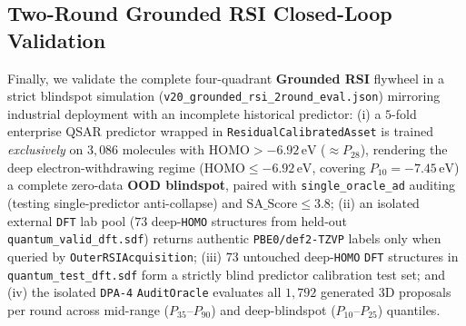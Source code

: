 \documentclass[11pt,a4paper]{article}
\begin{document}
\FloatBarrier
\subsection{Two-Round Grounded RSI Closed-Loop Validation}
\label{sec:exp_rsi}

Finally, we validate the complete four-quadrant \textbf{Grounded RSI} flywheel in a strict blindspot simulation (\texttt{v20\_grounded\_rsi\_2round\_eval.json}) mirroring industrial deployment with an incomplete historical predictor:
(i) a $5$-fold enterprise QSAR predictor wrapped in \texttt{Residual\allowbreak Calibrated\allowbreak Asset} is trained \emph{exclusively} on $3{,}086$ molecules with $\text{HOMO} > -6.92\,\text{eV}$ ($\approx P_{28}$), rendering the deep electron-withdrawing regime ($\text{HOMO} \le -6.92\,\text{eV}$, covering $P_{10} = -7.45\,\text{eV}$) a complete zero-data \textbf{OOD blindspot}, paired with \texttt{single\_oracle\_ad} auditing (testing single-predictor anti-collapse) and $\text{SA\_Score} \le 3.8$;
(ii) an isolated external \texttt{DFT} lab pool ($73$ deep-\texttt{HOMO} structures from held-out \texttt{quantum\_valid\_dft.sdf}) returns authentic \texttt{PBE0/def2-TZVP} labels only when queried by \texttt{OuterRSIAcquisition};
(iii) $73$ untouched deep-\texttt{HOMO} \texttt{DFT} structures in \texttt{quantum\_test\_dft.sdf} form a strictly blind predictor calibration test set; and
(iv) the isolated \texttt{DPA-4} \texttt{AuditOracle} evaluates all $1{,}792$ generated 3D proposals per round across mid-range ($P_{35}\text{--}P_{90}$) and deep-blindspot ($P_{10}\text{--}P_{25}$) quantiles.
\end{document}
